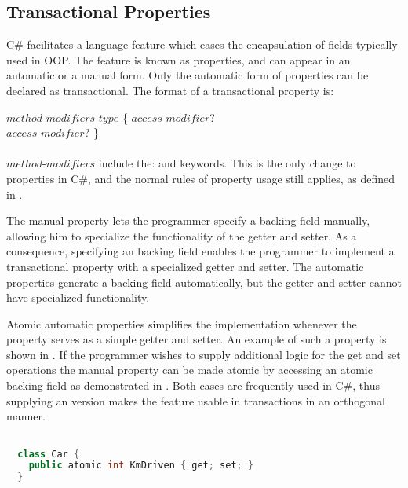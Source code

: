\subsection{Transactional Properties}\label{subsec:design_properties}
C\# facilitates a language feature which eases the encapsulation of fields typically used in \ac{OOP}. The feature is known as properties, and can appear in an automatic or a manual form\cite[p. 52]{sestoft2011c}. Only the automatic form of properties can be declared as transactional. The format of a transactional property is:

 $method$-$modifiers$ $type$  \{ $access$-$modifier$? \bscode{;} \\ $access$-$modifier$? \bscode{;} \}
\\\\

$method$-$modifiers$ include the:      and  keywords. This is the only change to properties in C\#, and the normal rules of property usage still applies, as defined in \cite[p. 52]{sestoft2011c}.

The manual property lets the programmer specify a backing field manually, allowing him to specialize the functionality of the getter and setter. As a consequence, specifying an  backing field enables the programmer to implement a transactional property with a specialized getter and setter. The automatic properties generate a backing field automatically, but the getter and setter cannot have specialized functionality. 

Atomic automatic properties simplifies the implementation whenever the property serves as a simple getter and setter. An example of such a property is shown in . If the programmer wishes to supply additional logic for the get and set operations the manual property can be made atomic by accessing an atomic backing field as demonstrated in . Both cases are frequently used in C\#, thus supplying an  version makes the feature usable in transactions in an orthogonal manner.

\begin{lstlisting}[label=lst:auto_atomic_property,
 caption={Automatic Transactional Properties},
 language=Java, 
 showspaces=false,
 showtabs=false,
 breaklines=true,
 showstringspaces=false,
 breakatwhitespace=true,
 commentstyle=\color{greencomments},
 keywordstyle=\color{bluekeywords},
 stringstyle=\color{redstrings},
 morekeywords={atomic, retry, orElse, var, get, set}]  % Start your code-block

  class Car {
    public atomic int KmDriven { get; set; }
  }
\end{lstlisting}

